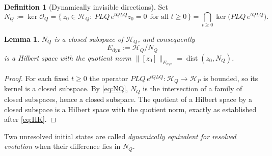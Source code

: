 \documentclass[11pt,reqno]{amsart}
\numberwithin{equation}{section}
\theoremstyle{plain}
\newtheorem{lemma}[theorem]{Lemma}
\theoremstyle{definition}
\newtheorem{definition}[theorem]{Definition}
\theoremstyle{remark}
\newcommand{\HP}{\mathcal{H}_{P}}
\newcommand{\HQ}{\mathcal{H}_{Q}}
\newcommand{\Edyn}{E_{\mathrm{dyn}}}
\newcommand{\Op}{\mathcal{O}_{Q}}
\begin{document}
\begin{definition}[Dynamically invisible directions]
\label{def:NQ}
Set
\begin{equation}
\label{eq:NQ}
N_{Q}:=\ker\Op
=\bigl\{\,z_{0}\in\HQ:\ PLQ\,e^{tQLQ}z_{0}=0\ \ \text{for all }t\ge0\,\bigr\}
=\bigcap_{t\ge0}\ker\bigl(PLQ\,e^{tQLQ}\bigr).
\end{equation}
\end{definition}

\begin{lemma}
\label{lem:NQclosed}
$N_{Q}$ is a closed subspace of $\HQ$, and consequently
\begin{equation}
\label{eq:Edyn}
\Edyn:=\HQ/N_{Q}
\end{equation}
is a Hilbert space with the quotient norm
$\lVert[z_{0}]\rVert_{\Edyn}=\operatorname{dist}(z_{0},N_{Q})$.
\end{lemma}

\begin{proof}
For each fixed $t\ge0$ the operator $PLQ\,e^{tQLQ}:\HQ\to\HP$ is bounded, so its kernel is a
closed subspace. By \eqref{eq:NQ}, $N_{Q}$ is the intersection of a family of closed
subspaces, hence a closed subspace. The quotient of a Hilbert space by a closed subspace is
a Hilbert space with the quotient norm, exactly as established after \eqref{eq:HK}.
\end{proof}

Two unresolved initial states are called \emph{dynamically equivalent for resolved evolution}
when their difference lies in $N_{Q}$.
\end{document}
